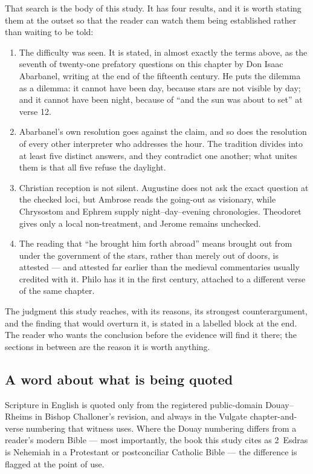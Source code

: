 That search is the body of this study. It has four results, and it is worth
stating them at the outset so that the reader can watch them being established
rather than waiting to be told:

\begin{enumerate}[leftmargin=1.4em,itemsep=0.25em,topsep=0.35em]
\item The difficulty was seen. It is stated, in almost exactly the terms above,
  as the seventh of twenty-one prefatory questions on this chapter by Don Isaac
  Abarbanel, writing at the end of the fifteenth century. He puts the dilemma as
  a dilemma: it cannot have been day, because stars are not visible by day; and
  it cannot have been night, because of ``and the sun was about to set'' at verse
  12.
\item Abarbanel's own resolution goes against the claim, and so does the
  resolution of every other interpreter who addresses the hour. The tradition
  divides into at least five distinct answers, and they contradict one another;
  what unites them is that all five refuse the daylight.
\item Christian reception is not silent. Augustine does not ask the exact
  question at the checked loci, but Ambrose reads the going-out as visionary,
  while Chrysostom and Ephrem supply night--day--evening chronologies. Theodoret
  gives only a local non-treatment, and Jerome remains unchecked.
\item The reading that ``he brought him forth abroad'' means brought out from
  under the government of the stars, rather than merely out of doors, is
  attested --- and attested far earlier than the medieval commentaries usually
  credited with it. Philo has it in the first century, attached to a different
  verse of the same chapter.
\end{enumerate}

\noindent The judgment this study reaches, with its reasons, its strongest
counterargument, and the finding that would overturn it, is stated in a labelled
block at the end. The reader who wants the conclusion before the evidence will
find it there; the sections in between are the reason it is worth anything.

\subsection{A word about what is being quoted}

Scripture in English is quoted only from the registered public-domain
Douay--Rheims in Bishop Challoner's revision, and always in the Vulgate
chapter-and-verse numbering that witness uses. Where the Douay numbering differs
from a reader's modern Bible --- most importantly, the book this study cites as
2~Esdras is Nehemiah in a Protestant or postconciliar Catholic Bible --- the
difference is flagged at the point of use.

